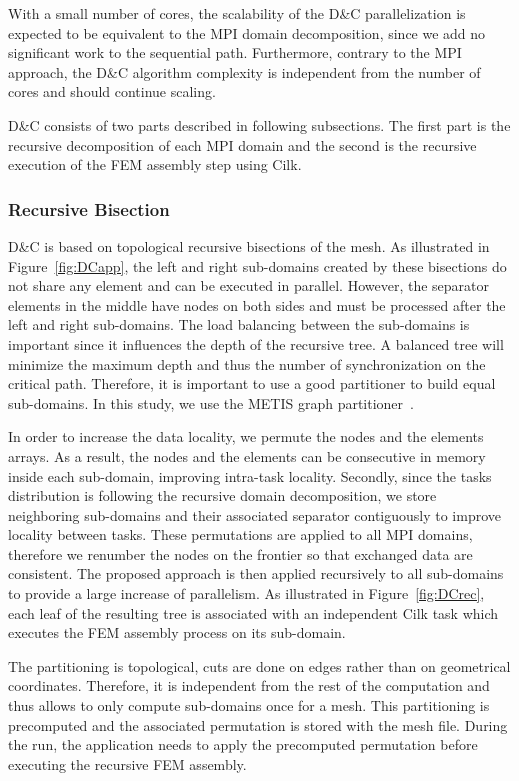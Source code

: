 \documentclass[10pt]{IOS-Book-Article}
\begin{document}
With a small number of cores, the scalability of the D\&C parallelization is expected to be equivalent to the MPI domain decomposition, since we add no significant work to the sequential path.
Furthermore, contrary to the MPI approach, the D\&C algorithm complexity is independent from the number of cores and should continue scaling.


D\&C consists of two parts described in following subsections.
The first part is the recursive decomposition of each MPI domain and the second is the recursive execution of the FEM assembly step using Cilk.

\subsubsection{Recursive Bisection}
\label{sec:DCrec}
D\&C is based on topological recursive bisections of the mesh.
As illustrated in Figure~\ref{fig:DCapp}, the left and right sub-domains created by these bisections do not share any element and can be executed in parallel.
However, the separator elements in the middle have nodes on both sides and must be processed after the left and right sub-domains.
The load balancing between the sub-domains is important since it influences the depth of the recursive tree.
A balanced tree will minimize the maximum depth and thus the number of synchronization on the critical path.
Therefore, it is important to use a good partitioner to build equal sub-domains.
In this study, we use the METIS graph partitioner~\cite{Metis}.

In order to increase the data locality, we permute the nodes and the elements arrays.
As a result, the nodes and the elements can be consecutive in memory inside each sub-domain, improving intra-task locality.
Secondly, since the tasks distribution is following the recursive domain decomposition, we store neighboring sub-domains and their associated separator contiguously to improve locality between tasks.
These permutations are applied to all MPI domains, therefore we renumber the nodes on the frontier so that exchanged data are consistent.
The proposed approach is then applied recursively to all sub-domains to provide a large increase of parallelism.
As illustrated in Figure~\ref{fig:DCrec}, each leaf of the resulting tree is associated with an independent Cilk task which executes the FEM assembly process on its sub-domain.

The partitioning is topological, cuts are done on edges rather than on geometrical coordinates.
Therefore, it is independent from the rest of the computation and thus allows to only compute sub-domains once for a mesh.
This partitioning is precomputed and the associated permutation is stored with the mesh file.
During the run, the application needs to apply the precomputed permutation before executing the recursive FEM assembly.
\end{document}
